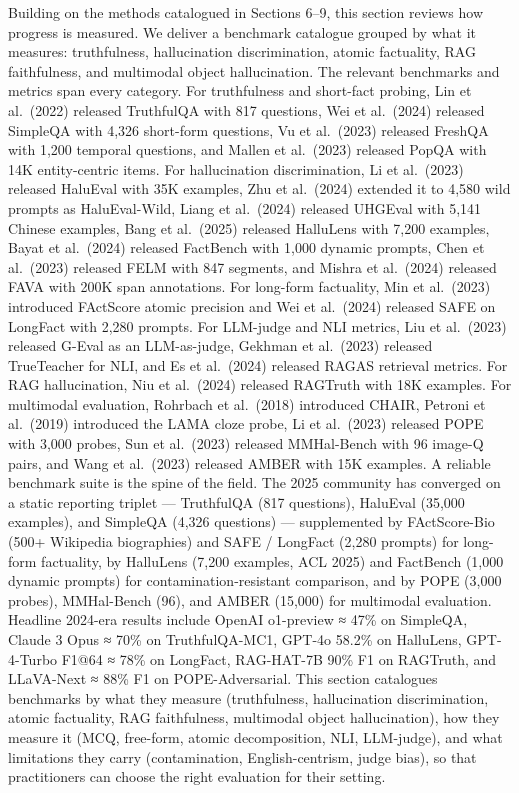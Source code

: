 \documentclass{article}
\begin{document}
Building on the methods catalogued in Sections 6--9, this section reviews how progress is measured. We deliver a benchmark catalogue grouped by what it measures: truthfulness, hallucination discrimination, atomic factuality, RAG faithfulness, and multimodal object hallucination. The relevant benchmarks and metrics span every category. For truthfulness and short-fact probing, Lin et al.~(2022) released TruthfulQA with 817 questions, Wei et al.~(2024) released SimpleQA with 4,326 short-form questions, Vu et al.~(2023) released FreshQA with 1,200 temporal questions, and Mallen et al.~(2023) released PopQA with 14K entity-centric items. For hallucination discrimination, Li et al.~(2023) released HaluEval with 35K examples, Zhu et al.~(2024) extended it to 4,580 wild prompts as HaluEval-Wild, Liang et al.~(2024) released UHGEval with 5,141 Chinese examples, Bang et al.~(2025) released HalluLens with 7,200 examples, Bayat et al.~(2024) released FactBench with 1,000 dynamic prompts, Chen et al.~(2023) released FELM with 847 segments, and Mishra et al.~(2024) released FAVA with 200K span annotations. For long-form factuality, Min et al.~(2023) introduced FActScore atomic precision and Wei et al.~(2024) released SAFE on LongFact with 2,280 prompts. For LLM-judge and NLI metrics, Liu et al.~(2023) released G-Eval as an LLM-as-judge, Gekhman et al.~(2023) released TrueTeacher for NLI, and Es et al.~(2024) released RAGAS retrieval metrics. For RAG hallucination, Niu et al.~(2024) released RAGTruth with 18K examples. For multimodal evaluation, Rohrbach et al.~(2018) introduced CHAIR, Petroni et al.~(2019) introduced the LAMA cloze probe, Li et al.~(2023) released POPE with 3,000 probes, Sun et al.~(2023) released MMHal-Bench with 96 image-Q pairs, and Wang et al.~(2023) released AMBER with 15K examples. A reliable benchmark suite is the spine of the field. The 2025 community has converged on a static reporting triplet --- TruthfulQA (817 questions), HaluEval (35,000 examples), and SimpleQA (4,326 questions) --- supplemented by FActScore-Bio (500+ Wikipedia biographies) and SAFE / LongFact (2,280 prompts) for long-form factuality, by HalluLens (7,200 examples, ACL 2025) and FactBench (1,000 dynamic prompts) for contamination-resistant comparison, and by POPE (3,000 probes), MMHal-Bench (96), and AMBER (15,000) for multimodal evaluation. Headline 2024-era results include OpenAI o1-preview ≈ 47\% on SimpleQA, Claude 3 Opus ≈ 70\% on TruthfulQA-MC1, GPT-4o 58.2\% on HalluLens, GPT-4-Turbo F1@64 ≈ 78\% on LongFact, RAG-HAT-7B 90\% F1 on RAGTruth, and LLaVA-Next ≈ 88\% F1 on POPE-Adversarial. This section catalogues benchmarks by what they measure (truthfulness, hallucination discrimination, atomic factuality, RAG faithfulness, multimodal object hallucination), how they measure it (MCQ, free-form, atomic decomposition, NLI, LLM-judge), and what limitations they carry (contamination, English-centrism, judge bias), so that practitioners can choose the right evaluation for their setting.
\end{document}
